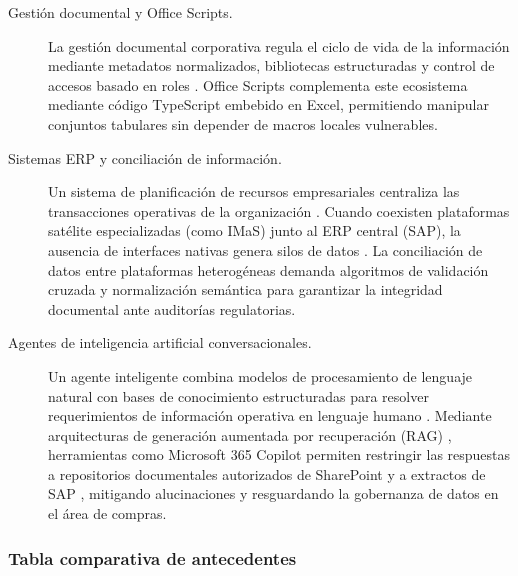 \begin{description}
\item[Gestión documental y Office Scripts.] La gestión documental corporativa regula el ciclo de vida de la información mediante metadatos normalizados, bibliotecas estructuradas y control de accesos basado en roles \cite{microsoft2025sharepointDoc}. Office Scripts complementa este ecosistema mediante código TypeScript embebido en Excel, permitiendo manipular conjuntos tabulares sin depender de macros locales vulnerables.

\item[Sistemas ERP y conciliación de información.] Un sistema de planificación de recursos empresariales centraliza las transacciones operativas de la organización \cite{ibm2024erp}. Cuando coexisten plataformas satélite especializadas (como IMaS) junto al ERP central (SAP), la ausencia de interfaces nativas genera silos de datos \cite{themistocleous2004eai, ibm2024erpIntegracion}. La conciliación de datos entre plataformas heterogéneas demanda algoritmos de validación cruzada y normalización semántica para garantizar la integridad documental ante auditorías regulatorias.

\item[Agentes de inteligencia artificial conversacionales.] Un agente inteligente combina modelos de procesamiento de lenguaje natural con bases de conocimiento estructuradas para resolver requerimientos de información operativa en lenguaje humano \cite{davenport2018ai, guida2023ai}. Mediante arquitecturas de generación aumentada por recuperación (RAG) \cite{lewis2020rag}, herramientas como Microsoft 365 Copilot permiten restringir las respuestas a repositorios documentales autorizados de SharePoint y a extractos de SAP \cite{microsoft2026copilotStudioOverview, microsoft2026knowledgeSources}, mitigando alucinaciones y resguardando la gobernanza de datos en el área de compras.

\end{description}

\subsubsection{Tabla comparativa de antecedentes} \label{subsec:tabla_comparativa_antecedentes} %

